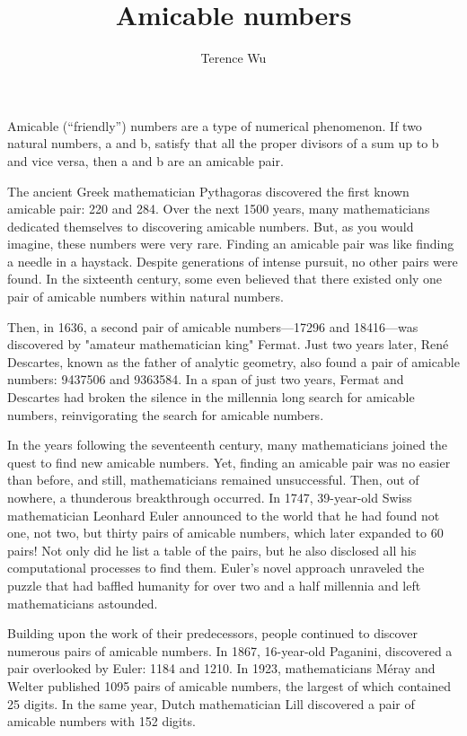 \documentclass[12pt]{article}
\title{Amicable numbers}
\author{Terence Wu}
\begin{document}
\maketitle

Amicable (“friendly”) numbers are a type of numerical phenomenon. If two natural
numbers, a and b, satisfy that all the proper divisors of a sum up to b and vice versa, then a and
b are an amicable pair.

The ancient Greek mathematician Pythagoras discovered the first known amicable pair:
220 and 284. Over the next 1500 years, many mathematicians dedicated themselves to
discovering amicable numbers. But, as you would imagine, these numbers were very rare.
Finding an amicable pair was like finding a needle in a haystack. Despite generations of intense
pursuit, no other pairs were found. In the sixteenth century, some even believed that there
existed only one pair of amicable numbers within natural numbers.

Then, in 1636, a second pair of amicable numbers—17296 and 18416—was discovered
by "amateur mathematician king" Fermat. Just two years later, René Descartes, known as the
father of analytic geometry, also found a pair of amicable numbers: 9437506 and 9363584. In a
span of just two years, Fermat and Descartes had broken the silence in the millennia long
search for amicable numbers, reinvigorating the search for amicable numbers.

In the years following the seventeenth century, many mathematicians joined the quest to
find new amicable numbers. Yet, finding an amicable pair was no easier than before, and still,
mathematicians remained unsuccessful. Then, out of nowhere, a thunderous breakthrough
occurred. In 1747, 39-year-old Swiss mathematician Leonhard Euler announced to the world
that he had found not one, not two, but thirty pairs of amicable numbers, which later expanded
to 60 pairs! Not only did he list a table of the pairs, but he also disclosed all his computational
processes to find them. Euler's novel approach unraveled the puzzle that had baffled humanity
for over two and a half millennia and left mathematicians astounded.

Building upon the work of their predecessors, people continued to discover numerous
pairs of amicable numbers. In 1867, 16-year-old Paganini, discovered a pair overlooked by
Euler: 1184 and 1210. In 1923, mathematicians Méray and Welter published 1095 pairs of
amicable numbers, the largest of which contained 25 digits. In the same year, Dutch
mathematician Lill discovered a pair of amicable numbers with 152 digits.
\end{document}
